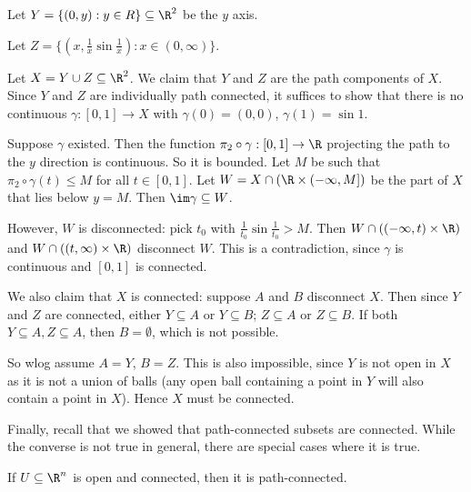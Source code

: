 \documentclass[a4paper]{article}
\begin{document}
\begin{eg}
  Let $Y = \{(0, y): y\in R\}\subseteq \R^2$ be the $y$ axis.

  Let $Z = \{(x, \frac{1}{x}\sin \frac{1}{x}): x\in (0, \infty)\}$.
  \begin{center}
  \end{center}

  Let $X = Y\cup Z\subseteq \R^2$. We claim that $Y$ and $Z$ are the path components of $X$. Since $Y$ and $Z$ are individually path connected, it suffices to show that there is no continuous $\gamma: [0, 1]\to X$ with $\gamma(0) = (0, 0)$, $\gamma(1) = \sin 1$.

  Suppose $\gamma$ existed. Then the function $\pi_2\circ \gamma: [0, 1] \to \R$ projecting the path to the $y$ direction is continuous. So it is bounded. Let $M$ be such that $\pi_2\circ \gamma (t) \leq M$ for all $t\in [0, 1]$. Let $W = X\cap (\R \times (-\infty, M])$ be the part of $X$ that lies below $y = M$.  Then $\im \gamma \subseteq W$.

  However, $W$ is disconnected: pick $t_0$ with $\frac{1}{t_0} \sin\frac{1}{t_0} > M$. Then $W \cap ((-\infty, t)\times \R)$ and $W\cap ((t, \infty)\times \R)$ disconnect $W$. This is a contradiction, since $\gamma$ is continuous and $[0, 1]$ is connected.

  We also claim that $X$ is connected: suppose $A$ and $B$ disconnect $X$. Then since $Y$ and $Z$ are connected, either $Y\subseteq A$ or $Y\subseteq B$; $Z\subseteq A$ or $Z\subseteq B$. If both $Y\subseteq A, Z\subseteq A$, then $B=\emptyset$, which is not possible.

  So wlog assume $A = Y$, $B = Z$. This is also impossible, since $Y$ is not open in $X$ as it is not a union of balls (any open ball containing a point in $Y$ will also contain a point in $X$). Hence $X$ must be connected.
\end{eg}

Finally, recall that we showed that path-connected subsets are connected. While the converse is not true in general, there are special cases where it is true.
\begin{prop}
  If $U\subseteq \R^n$ is open and connected, then it is path-connected.
\end{prop}
\end{document}
